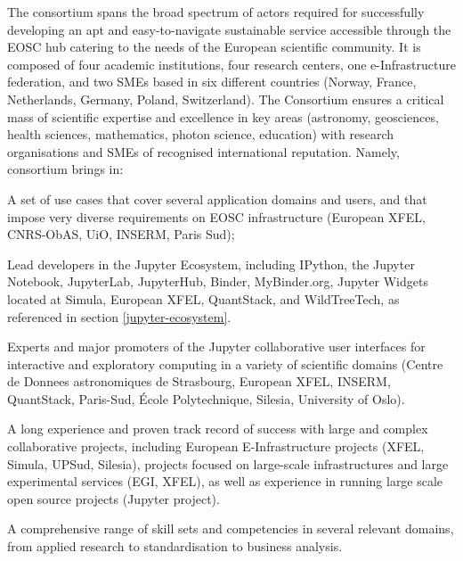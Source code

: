 The \TheProject consortium spans the broad spectrum of actors required
for successfully developing an apt and easy-to-navigate sustainable service
accessible through the EOSC hub catering to the needs of the European
scientific community. It is composed of four academic institutions, four research
centers, one e-Infrastructure federation, and two SMEs based in six different countries (Norway, France,
Netherlands, Germany, Poland, Switzerland).
The Consortium ensures a critical mass of scientific expertise and excellence
in key areas (astronomy, geosciences, health sciences,
mathematics, photon science, education) with research organisations and SMEs of recognised
 international reputation. Namely, \TheProject consortium brings in:
\begin{compactitem}
\item A set of use cases that cover several application domains and users, and that impose very diverse
requirements on EOSC infrastructure (European XFEL, CNRS-ObAS, UiO, INSERM, Paris Sud);
\item Lead developers in the Jupyter Ecosystem, including IPython, the Jupyter Notebook, JupyterLab,
JupyterHub, Binder, MyBinder.org, Jupyter Widgets located at Simula, European XFEL, QuantStack, and
WildTreeTech,
as referenced in section \ref{jupyter-ecosystem}.
\item Experts and major promoters of the Jupyter collaborative user interfaces for interactive and exploratory
computing in a variety of scientific domains (Centre de Donnees
astronomiques de Strasbourg, European XFEL,
INSERM, QuantStack, Paris-Sud, \'Ecole Polytechnique, Silesia,
University of Oslo).
\item A long experience and proven track record of success with large and complex collaborative projects,
including
European E-Infrastructure projects (XFEL, Simula, UPSud, Silesia),
projects focused on large-scale infrastructures and large experimental services (EGI, XFEL),
as well as experience in running large scale open source projects (Jupyter project).
\item A comprehensive range of skill sets and competencies in several relevant domains, from applied
research to standardisation to business
analysis.
\end{compactitem}

